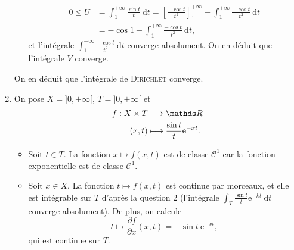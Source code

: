\begin{enumerate}
\begin{itemize}
				\begin{align*}
					0 \le U &= \int_{1}^{+\infty} \frac{\sin t}{t}~\mathrm{d}t = \left[ \frac{-\cos t}{t^2} \right]_1^{+\infty} - \int_{1}^{+\infty}\frac{-\cos t}{t^2} ~\mathrm{d}t\\
					&= -\cos 1 - \int_{1}^{+\infty} \frac{-\cos t}{t^2}~\mathrm{d}t,
				\end{align*}
				et l'intégrale $\int_{1}^{+\infty} \frac{-\cos t}{t^2}~\mathrm{d}t$\/ converge absolument. On en déduit que l'intégrale $V$\/ converge.
		\end{itemize}
		On en déduit que l'intégrale de \textsc{Dirichlet} converge.
	\item On pose $X = {]0,+\infty[}$, $T = {]0,+\infty[}$\/ et \begin{align*}
			f: X \times T &\longrightarrow \R \\
			(x,t) &\longmapsto \frac{\sin t}{t} \mathrm{e}^{-xt}.
		\end{align*}
		\begin{itemize}
			\item Soit $t \in T$. La fonction $x \mapsto f(x,t)$\/ est de classe $\mathcal{C}^1$\/ car la fonction exponentielle est de classe $\mathcal{C}^1$.
			\item Soit $x \in X$. La fonction $t \mapsto f(x,t)$\/ est continue par morceaux, et elle est intégrable sur $T$\/ d'après la question 2 (l'intégrale $\int_{T} \frac{\sin t}{t}\mathrm{e}^{-kt}~\mathrm{d}t$\/ converge absolument). De plus, on calcule \[
					t \mapsto \frac{\partial f}{\partial x}(x,t) = -{\sin t}\:\mathrm{e}^{-xt},
				\] qui est continue sur $T$.
		\end{itemize}
\end{enumerate}

